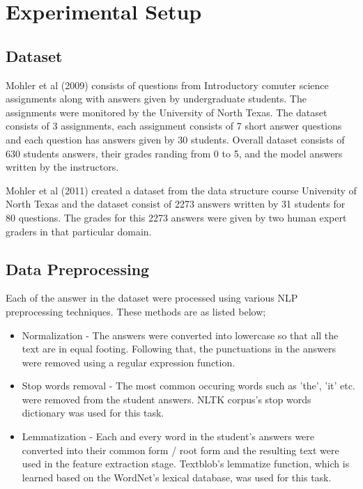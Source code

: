 \chapter{Experimental Setup}

\section{Dataset}

Mohler et al (2009)\cite{Mohler2009} consists of questions from Introductory comuter science assignments along with answers given by undergraduate students. The assignments were monitored by the University of North Texas. The dataset consists of 3 assignments, each assignment consists of 7 short answer questions and each question has answers given by 30 students. Overall dataset consists of 630 students answers, their grades randing from 0 to 5, and the model answers written by the instructors. 

Mohler et al (2011)\cite{Mohler2011} created a dataset from the data structure course University of North Texas and the dataset consist of 2273 answers written by 31 students for 80 questions. The grades for this 2273 answers were given by two human expert graders in that particular domain.

\section{Data Preprocessing}

Each of the answer in the dataset were processed using various NLP preprocessing techniques. These methods are as listed below;

\begin{itemize}
	\item Normalization - The answers were converted into lowercase so that all the text are in equal footing. Following that, the punctuations in the answers were removed using a regular expression function. 
	\item Stop words removal - The most common occuring words such as 'the', 'it' etc. were removed from the student answers. NLTK corpus's stop words dictionary was used for this task.
	\item Lemmatization - Each and every word in the student's answers were converted into their common form / root form and the resulting text were used in the feature extraction stage. Textblob's lemmatize function, which is learned based on the WordNet's lexical database, was used for this task. 
\end{itemize}

